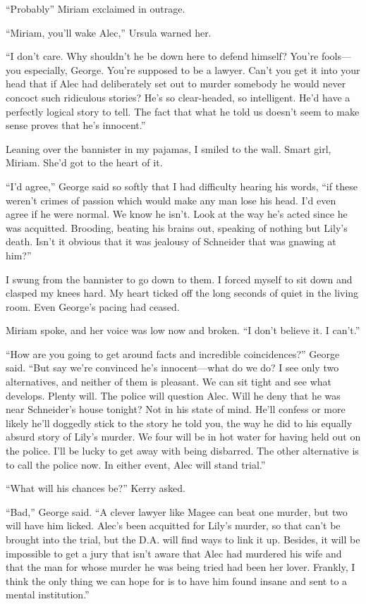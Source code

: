 \documentclass{novel}
\begin{document}
“Probably” Miriam exclaimed in outrage.

“Miriam, you’ll wake Alec,” Ursula warned her.

“I don’t care. Why shouldn’t he be down here to defend himself? You’re fools—you especially, George. You’re supposed to be a lawyer. Can’t you get it into your head that if Alec had deliberately set out to murder somebody he would never concoct such ridiculous stories? He’s so clear-headed, so intelligent. He’d have a perfectly logical story to tell. The fact that what he told us doesn’t seem to make sense proves that he’s innocent.”

Leaning over the bannister in my pajamas, I smiled to the wall. Smart girl, Miriam. She’d got to the heart of it.

“I’d agree,” George said so softly that I had difficulty hearing his words, “if these weren’t crimes of passion which would make any man lose his head. I’d even agree if he were normal. We know he isn’t. Look at the way he’s acted since he was acquitted. Brooding, beating his brains out, speaking of nothing but Lily’s death. Isn’t it obvious that it was jealousy of Schneider that was gnawing at him?”

I swung from the bannister to go down to them. I forced myself to sit down and clasped my knees hard. My heart ticked off the long seconds of quiet in the living room. Even George’s pacing had ceased.

Miriam spoke, and her voice was low now and broken. “I don’t believe it. I can’t.”

“How are you going to get around facts and incredible coincidences?” George said. “But say we’re convinced he’s innocent—what do we do? I see only two alternatives, and neither of them is pleasant. We can sit tight and see what develops. Plenty will. The police will question Alec. Will he deny that he was near Schneider’s house tonight? Not in his state of mind. He’ll confess or more likely he’ll doggedly stick to the story he told you, the way he did to his equally absurd story of Lily’s murder. We four will be in hot water for having held out on the police. I’ll be lucky to get away with being disbarred. The other alternative is to call the police now. In either event, Alec will stand trial.”

“What will his chances be?” Kerry asked.

“Bad,” George said. “A clever lawyer like Magee can beat one murder, but two will have him licked. Alec’s been acquitted for Lily’s murder, so that can’t be brought into the trial, but the D.A. will find ways to link it up. Besides, it will be impossible to get a jury that isn’t aware that Alec had murdered his wife and that the man for whose murder he was being tried had been her lover. Frankly, I think the only thing we can hope for is to have him found insane and sent to a mental institution.”
\end{document}
